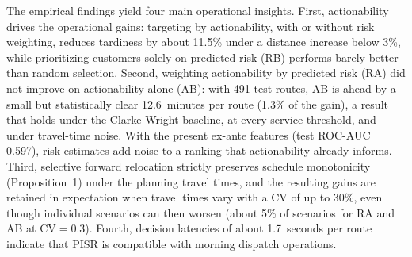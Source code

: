 \documentclass[11pt,a4paper]{article}
\begin{document}
The empirical findings yield four main operational insights. First, actionability drives the operational gains: targeting by actionability, with or without risk weighting, reduces tardiness by about 11.5\% under a distance increase below 3\%, while prioritizing customers solely on predicted risk (RB) performs barely better than random selection. Second, weighting actionability by predicted risk (RA) did not improve on actionability alone (AB): with 491 test routes, AB is ahead by a small but statistically clear 12.6~minutes per route (1.3\% of the gain), a result that holds under the Clarke-Wright baseline, at every service threshold, and under travel-time noise. With the present ex-ante features (test ROC-AUC 0.597), risk estimates add noise to a ranking that actionability already informs. Third, selective forward relocation strictly preserves schedule monotonicity (Proposition~1) under the planning travel times, and the resulting gains are retained in expectation when travel times vary with a CV of up to 30\%, even though individual scenarios can then worsen (about 5\% of scenarios for RA and AB at $\mathrm{CV}=0.3$). Fourth, decision latencies of about 1.7~seconds per route indicate that PISR is compatible with morning dispatch operations.
\end{document}
